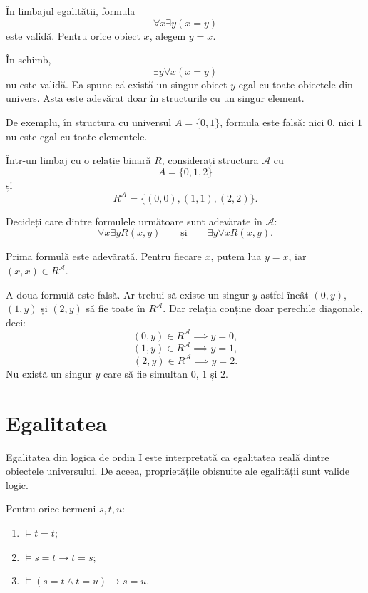 \begin{eg}
	În limbajul egalității, formula
	\[
		\forall x \exists y (x = y)
	\]
	este validă. Pentru orice obiect \(x\), alegem \(y=x\).

	În schimb,
	\[
		\exists y \forall x (x = y)
	\]
	nu este validă. Ea spune că există un singur obiect \(y\) egal cu toate obiectele din univers. Asta este adevărat doar în structurile cu un singur element.

	De exemplu, în structura cu universul \(A=\{0,1\}\), formula este falsă: nici \(0\), nici \(1\) nu este egal cu toate elementele.
\end{eg}

\begin{ex}
	Într-un limbaj cu o relație binară \(R\), considerați structura \( \mathcal{A} \) cu
	\[
		A = \{0,1,2\}
	\]
	și
	\[
		R^\mathcal{A} = \{(0,0),(1,1),(2,2)\}.
	\]

	Decideți care dintre formulele următoare sunt adevărate în \( \mathcal{A} \):
	\[
		\forall x \exists y R(x,y)
		\qquad
		\text{și}
		\qquad
		\exists y \forall x R(x,y).
	\]
\end{ex}

\begin{solutie}
	Prima formulă este adevărată. Pentru fiecare \(x\), putem lua \(y=x\), iar \((x,x) \in R^\mathcal{A}\).

	A doua formulă este falsă. Ar trebui să existe un singur \(y\) astfel încât \((0,y)\), \((1,y)\) și \((2,y)\) să fie toate în \(R^\mathcal{A}\).
	Dar relația conține doar perechile diagonale, deci:
	\[
		(0,y) \in R^\mathcal{A} \implies y=0,
	\]
	\[
		(1,y) \in R^\mathcal{A} \implies y=1,
	\]
	\[
		(2,y) \in R^\mathcal{A} \implies y=2.
	\]
	Nu există un singur \(y\) care să fie simultan \(0\), \(1\) și \(2\).
\end{solutie}

\section{Egalitatea}

Egalitatea din logica de ordin I este interpretată ca egalitatea reală dintre obiectele universului. De aceea, proprietățile obișnuite ale egalității sunt valide logic.

\begin{prop}
	Pentru orice termeni \(s,t,u\):
	\begin{enumerate}
		\item \( \models t = t \);
		\item \( \models s = t \to t = s \);
		\item \( \models (s = t \land t = u) \to s = u \).
	\end{enumerate}
\end{prop}
